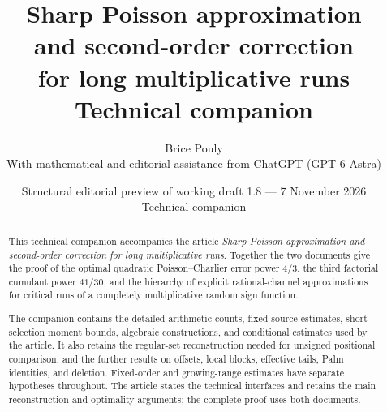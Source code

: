 \documentclass[11pt,a4paper]{article}
\title{\bfseries Sharp Poisson approximation\\and second-order correction\\for long multiplicative runs\\[9pt]\large Technical companion}
\author{Brice Pouly\\[5pt]
 \small With mathematical and editorial assistance from ChatGPT (GPT-6 Astra)}
\date{\small Structural editorial preview of working draft 1.8 --- 7 November 2026\\[3pt]Technical companion}
\begin{document}
\maketitle
\thispagestyle{plain}
\begin{abstract}
This technical companion accompanies the article \emph{Sharp Poisson
approximation and second-order correction for long multiplicative runs}.
Together the two documents give the proof of the optimal quadratic
Poisson--Charlier error power \(4/3\), the third factorial cumulant
power \(41/30\), and the hierarchy of explicit rational-channel
approximations for critical runs of a completely multiplicative
random sign function.

The companion contains the detailed arithmetic counts, fixed-source
estimates, short-selection moment bounds, algebraic constructions,
and conditional estimates used by the article. It also retains the
regular-set reconstruction needed for unsigned positional comparison,
and the further results on offsets, local blocks, effective tails,
Palm identities, and deletion. Fixed-order and growing-range
estimates have separate hypotheses throughout. The article states
the technical interfaces and retains the main reconstruction and
optimality arguments; the complete proof uses both documents.
\end{abstract}
\clearpage
\begingroup
\small
\setlength{\parskip}{0pt}
\tableofcontents
\endgroup
\clearpage























\clearpage

\end{document}
